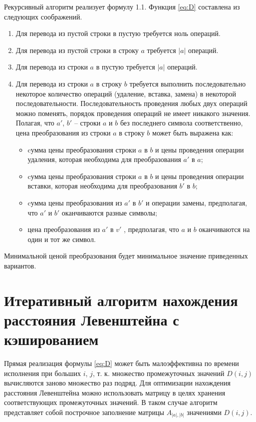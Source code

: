 \clearpage
Рекурсивный алгоритм реализует формулу 1.1. Функция \ref{eq:D} составлена из следующих соображений.

\begin{enumerate}
\item Для перевода из пустой строки в пустую требуется ноль операций.
\item Для перевода из пустой строки в строку $a$ требуется $|a|$ операций.
\item Для перевода из строки $a$ в пустую требуется $|a|$ операций.
\item Для перевода из строки $a$ в строку $b$ требуется выполнить последовательно некоторое количество операций (удаление, вставка, замена) в некоторой последовательности. Последовательность проведения любых двух операций можно поменять, порядок проведения операций не имеет никакого значения. Полагая, что $a'$, $b'$ -- строки $a$ и $b$ без последнего символа соответственно, цена преобразования из строки $a$ в строку $b$ может быть выражена как:
	\begin{itemize}
	\item cумма цены преобразования строки $a$ в $b$ и цены проведения операции удаления, которая необходима для преобразования $a'$ в $a$;
	\item cумма цены преобразования строки $a$ в $b$ и цены проведения операции вставки, которая необходима для преобразования $b'$ в $b$;
	\item cумма цены преобразования из $a'$ в $b'$ и операции замены, предполагая, что $a'$ и $b'$ оканчиваются разные символы;
	\item цена преобразования из $a'$ в $v'$ , предполагая, что $a$ и $b$ оканчиваются на один и тот же символ.
	\end{itemize}
\end{enumerate}
Минимальной ценой преобразования будет минимальное значение приведенных вариантов.

\section{Итеративный алгоритм нахождения расстояния Левенштейна с кэшированием}

Прямая реализация формулы \ref{eq:D} может быть малоэффективна по времени исполнения при больших $i$, $j$, т. к. множество промежуточных значений $D(i, j)$ вычисляются заново множество раз подряд. Для оптимизации нахождения расстояния Левенштейна можно использовать матрицу в целях хранения соответствующих промежуточных значений. В таком случае алгоритм представляет собой построчное заполнение матрицы
$A_{|a|,|b|}$ значениями $D(i, j)$.

